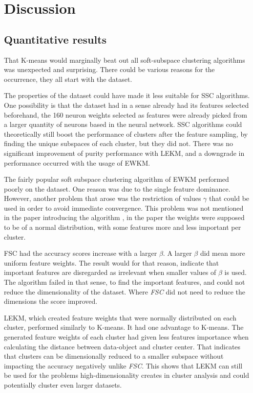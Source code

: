 \documentclass[../report.tex]{subfiles}
\begin{document}
\chapter{Discussion}

\section{Quantitative results}
That K-means would marginally beat out all soft-subspace clustering algorithms was unexpected and surprising. There could be various reasons for the occurrence, they all start with the dataset.

The properties of the dataset could have made it less suitable for SSC algorithms. One possibility is that the dataset had in a sense already had its features selected beforehand, the 160 neuron weights selected as features were already picked from a larger quantity of neurons based in the neural network. SSC algorithms could theoretically still boost the performance of clusters after the feature sampling, by finding the unique subspaces of each cluster, but they did not. There was no significant improvement of purity performance with LEKM, and a downgrade in performance occurred with the usage of EWKM.

The fairly popular soft subspace clustering algorithm of EWKM performed poorly on the dataset. One reason was due to the single feature dominance. However, another problem that arose was the restriction of values $\gamma$ that could be used in order to avoid immediate convergence. This problem was not mentioned in the paper introducing the algorithm \cite{Jing2007}, in the paper the weights were supposed to be of a normal distribution, with some features more and less important per cluster.

FSC had the accuracy scores increase with a larger $\beta$. A larger $\beta$ did mean more uniform feature weights. The result would for that reason, indicate that important features are disregarded as irrelevant when smaller values of $\beta$ is used. The algorithm failed in that sense, to find the important features, and could not reduce the dimensionality of the dataset. Where \textit{FSC} did not need to reduce the dimensions the score improved.

LEKM, which created feature weights that were normally distributed on each cluster, performed similarly to K-means. It had one advantage to K-means. The generated feature weights of each cluster had given less features importance when calculating the distance between data-object and cluster center. That indicates that clusters can be dimensionally reduced to a smaller subspace without impacting the accuracy negatively unlike \textit{FSC}. This shows that LEKM can still be used for the problems high-dimensionality creates in cluster analysis and could potentially cluster even larger datasets.
\end{document}
